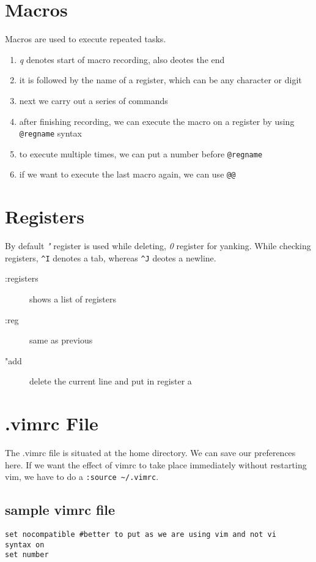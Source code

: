 \documentclass[a4paper, 12pt]{article}
\begin{document}
\section{Macros}
Macros are used to execute repeated tasks.
\begin{enumerate}
	\item \emph{q} denotes start of macro recording, also deotes the end	
	\item it is followed by the name of a register, which can be any character or digit
	\item next we carry out a series of commands
	\item after finishing recording, we can execute the macro on a register by using \verb|@regname| syntax
	\item to execute multiple times, we can put a number before \verb|@regname|
	\item if we want to execute the last macro again, we can use \verb|@@|
\end{enumerate}

\section{Registers}
By default \emph{"} register is used while deleting, \emph{0} register for yanking. While checking registers, \verb|^I| denotes a tab, whereas \verb|^J| deotes a newline.
\begin{description}
	\item[:registers] shows a list of registers	
	\item[:reg] same as previous
	\item["add] delete the current line and put in register a
\end{description}

\section{.vimrc File}
The .vimrc file is situated at the home directory. We can save our preferences here. If we want the effect of vimrc to take place immediately without restarting vim, we have to do a \verb|:source ~/.vimrc|.

\subsection{sample vimrc file}
\begin{verbatim}
set nocompatible #better to put as we are using vim and not vi
syntax on
set number
\end{verbatim}
\end{document}
